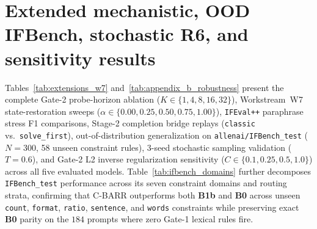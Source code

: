 \documentclass{article}
\begin{document}
\begin{table}[h]
\centering
\caption{Empirical verification of Proposition~\ref{prop:conformal} degradation bounds ($\delta=0.05, M=29, n_{\text{dev}}=60$) and hindsight \texttt{Oracle\_UB} efficiency retention across all five backbones ($N=450$).}
\label{tab:conformal_audit}
\end{table}

\section{Extended mechanistic, OOD IFBench, stochastic R6, and sensitivity results}
\label{app:robustness}

Tables~\ref{tab:extensions_w7} and~\ref{tab:appendix_b_robustness} present the complete Gate-2 probe-horizon ablation ($K \in \{1, 4, 8, 16, 32\}$), Workstream~W7 state-restoration sweeps ($\alpha \in \{0.00, 0.25, 0.50, 0.75, 1.00\}$), \texttt{IFEval++} paraphrase stress F1 comparisons, Stage-2 completion bridge replays (\texttt{classic} vs.\ \texttt{solve\_first}), out-of-distribution generalization on \texttt{allenai/IFBench\_test} ($N=300$, 58 unseen constraint rules), 3-seed stochastic sampling validation ($T=0.6$), and Gate-2 L2 inverse regularization sensitivity ($C \in \{0.1, 0.25, 0.5, 1.0\}$) across all five evaluated models. Table~\ref{tab:ifbench_domains} further decomposes \texttt{IFBench\_test} performance across its seven constraint domains and routing strata, confirming that C-BARR outperforms both \textbf{B1b} and \textbf{B0} across unseen \texttt{count}, \texttt{format}, \texttt{ratio}, \texttt{sentence}, and \texttt{words} constraints while preserving exact \textbf{B0} parity on the $184$ prompts where zero Gate-1 lexical rules fire.
\end{document}
